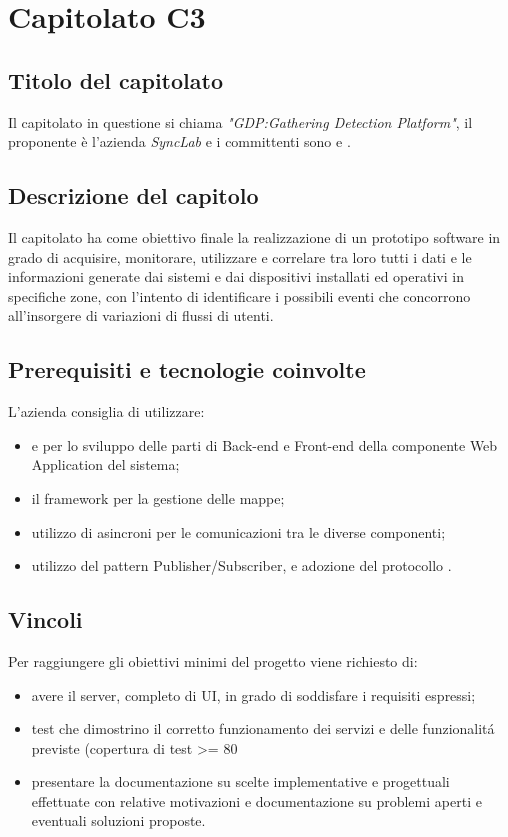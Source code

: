 \section{Capitolato C3}
\subsection{Titolo del capitolato}
Il capitolato in questione si chiama \textit{"GDP:Gathering Detection Platform"}, il proponente \`e l'azienda \textit{SyncLab} e i committenti sono \VT{} e \CR{}.

\subsection{Descrizione del capitolo}
Il capitolato ha come obiettivo finale la realizzazione di un prototipo software in grado di acquisire, monitorare, utilizzare e correlare tra loro tutti i dati e le informazioni generate dai sistemi e dai dispositivi installati ed operativi in specifiche zone, con l’intento di identificare i possibili eventi che concorrono all’insorgere di variazioni di flussi di utenti.

\subsection{Prerequisiti e tecnologie coinvolte}
L'azienda consiglia di utilizzare:

\begin{itemize}
\item {} e  per lo sviluppo delle parti di Back-end e Front-end della componente Web Application del sistema;
\item il framework  per la gestione delle mappe;
\item utilizzo di asincroni per le comunicazioni tra le diverse componenti;
\item utilizzo del pattern Publisher/Subscriber, e adozione del protocollo . 
\end{itemize}

\subsection{Vincoli}
Per raggiungere gli obiettivi minimi del progetto viene richiesto di:

\begin{itemize}
\item avere il server, completo di UI, in grado di soddisfare i requisiti espressi; 
\item test che dimostrino il corretto funzionamento dei servizi e delle funzionalit\'a previste (copertura di test >= 80%
\item presentare la documentazione su scelte implementative e progettuali effettuate con relative motivazioni e documentazione su problemi aperti e eventuali soluzioni proposte.
\end{itemize}

